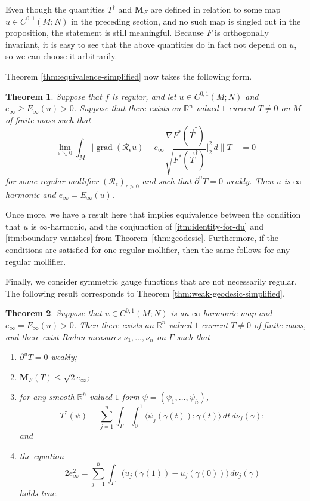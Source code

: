 \documentclass[a4paper]{article}
\newcommand{\R}{\mathbb{R}}
\newcommand{\M}{\mathbf{M}}
\newcommand{\ndim}{{\bar{n}}}
\DeclareMathOperator{\grad}{grad}
\newcommand{\pairing}[2]{\langle #1; #2 \rangle}
\newtheorem{theorem}{Theorem}
\theoremstyle{definition}
\theoremstyle{remark}
\begin{document}
Even though the quantities $T^\dagger$ and $\M_F$ are defined in relation to some
map $u \in C^{0, 1}(M; N)$ in the preceding section, and no such map is
singled out in the proposition, the statement is still meaningful.
Because $F$ is orthogonally invariant, it is easy to see that the above quantities do in fact not depend on $u$, so we can choose it arbitrarily.

Theorem \ref{thm:equivalence-simplified} now takes the following form.

\begin{theorem} \label{thm:equivalence}
Suppose that $f$ is regular, and
let $u \in C^{0, 1}(M; N)$ and $e_\infty \ge E_\infty(u) > 0$. Suppose that
there exists an $\R^n$-valued $1$-current $T \neq 0$ on $M$ of finite mass such that
\[
\lim_{\epsilon \searrow 0} \int_M \biggl|\grad(\mathcal{R}_\epsilon u) - e_\infty \frac{\nabla F^*(\vec{T}^\dagger)}{\sqrt{F^*(\vec{T}^\dagger)}}\biggr|_2^2 \, d\|T\| = 0
\]
for some regular mollifier $(\mathcal{R}_\epsilon)_{\epsilon >0}$ and such that
$\partial^u T = 0$ weakly.
Then $u$ is $\infty$-harmonic and $e_\infty = E_\infty(u)$.
\end{theorem}

Once more, we have a result here that implies equivalence between the
condition that $u$ is $\infty$-harmonic, and the conjunction of
\ref{itm:identity-for-du} and \ref{itm:boundary-vanishes} from
Theorem~\ref{thm:geodesic}. Furthermore, if the conditions are satisfied for one
regular mollifier, then the same follows for any regular mollifier.

Finally, we consider symmetric gauge functions that are not necessarily regular.
The following result corresponds to Theorem \ref{thm:weak-geodesic-simplified}.

\begin{theorem} \label{thm:geodesic-weak}
Suppose that $u \in C^{0, 1}(M; N)$ is an $\infty$-harmonic map and $e_\infty = E_\infty(u) > 0$. Then there exists an $\R^n$-valued $1$-current $T \neq 0$ of finite mass, and there exist Radon measures $\nu_1, \dotsc, \nu_\ndim$ on $\Gamma$ such that
\begin{enumerate}
\item \label{itm:vanishing-boundary2} $\partial^u T = 0$ weakly;
\item \label{itm:bound-on-mass} $\M_F(T) \le \sqrt{2} e_\infty$;
\item for any smooth $\R^\ndim$-valued $1$-form $\psi = (\psi_1, \dotsc, \psi_\ndim)$,
\begin{equation} \label{eq:representation-by-curves}
T^\dagger(\psi) = \sum_{j = 1}^\ndim \int_\Gamma \int_0^1 \pairing{\psi_j(\gamma(t))}{\dot{\gamma}(t)} \, dt \, d\nu_j(\gamma);
\end{equation}
and
\item \label{itm:weak-representation-of-du} the equation
\begin{equation} \label{eq:weak-representation-of-du}
2e_\infty^2 = \sum_{j = 1}^\ndim \int_\Gamma \bigl(u_j(\gamma(1)) - u_j(\gamma(0))\bigr) \, d\nu_j(\gamma)
\end{equation}
holds true.
\end{enumerate}
\end{theorem}
\end{document}
